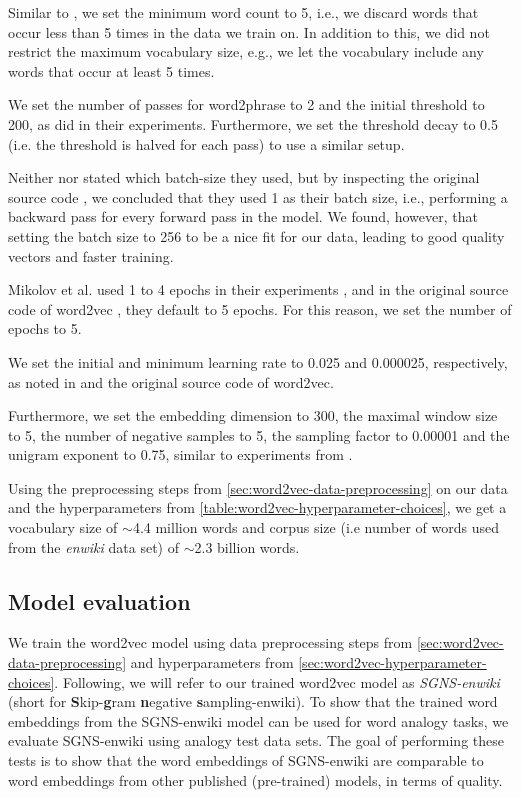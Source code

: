 Similar to \cite{mikolov2013b}, we set the minimum word count to 5, i.e., we discard words that occur less than 5 times in the data we train on. In addition to this, we did not restrict the maximum vocabulary size, e.g., we let the vocabulary include any words that occur at least 5 times.

We set the number of passes for word2phrase to 2 and the initial threshold to 200, as \cite{mikolov2013b} did in their experiments. Furthermore, we set the threshold decay to 0.5 (i.e. the threshold is halved for each pass) to use a similar setup.

Neither \cite{mikolov2013a} nor \cite{mikolov2013b} stated which batch-size they used, but by inspecting the original source code \cite[line 542]{Word2vecCCode}, we concluded that they used 1 as their batch size, i.e., performing a backward pass for every forward pass in the model. We found, however, that setting the batch size to 256 to be a nice fit for our data, leading to good quality vectors and faster training.

Mikolov et al. used 1 to 4 epochs in their experiments \cite{mikolov2013a, mikolov2013b}, and in the original source code of word2vec \cite[line 43]{Word2vecCCode}, they default to 5 epochs. For this reason, we set the number of epochs to 5.

We set the initial and minimum learning rate to 0.025 and 0.000025, respectively, as noted in \cite{mikolov2013a} and the original source code of word2vec.

Furthermore, we set the embedding dimension to 300, the maximal window size to 5, the number of negative samples to 5, the sampling factor to 0.00001 and the unigram exponent to 0.75, similar to experiments from \cite{mikolov2013b}.

Using the preprocessing steps from \cref{sec:word2vec-data-preprocessing} on our data and the hyperparameters from \cref{table:word2vec-hyperparameter-choices}, we get a vocabulary size of $\sim$4.4 million words and corpus size (i.e number of words used from the \textit{enwiki} data set) of $\sim$2.3 billion words.

\subsection{Model evaluation}
\label{sec:word2vec-model-evaluation}
We train the word2vec model using data preprocessing steps from \cref{sec:word2vec-data-preprocessing} and hyperparameters from \cref{sec:word2vec-hyperparameter-choices}. Following, we will refer to our trained word2vec model as \textit{SGNS-enwiki} (short for \textbf{S}kip-\textbf{g}ram \textbf{n}egative \textbf{s}ampling-enwiki). To show that the trained word embeddings from the SGNS-enwiki model can be used for word analogy tasks, we evaluate SGNS-enwiki using analogy test data sets. The goal of performing these tests is to show that the word embeddings of SGNS-enwiki are comparable to word embeddings from other published (pre-trained) models, in terms of quality.

